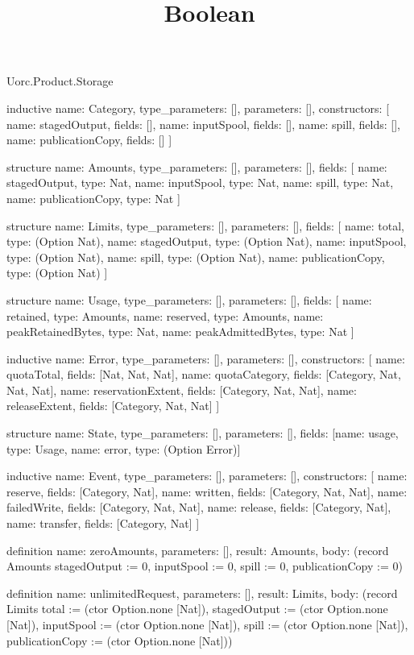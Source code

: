 \begin{lexlean}{Uorc.Product.Storage}
\title{Boolean}
\begin{semanticmodule}
inductive{
  name: Category,
  type_parameters: [],
  parameters: [],
  constructors: [
    {name: stagedOutput, fields: []},
    {name: inputSpool, fields: []},
    {name: spill, fields: []},
    {name: publicationCopy, fields: []}
  ]
}

structure{
  name: Amounts,
  type_parameters: [],
  parameters: [],
  fields: [
    {name: stagedOutput, type: Nat},
    {name: inputSpool, type: Nat},
    {name: spill, type: Nat},
    {name: publicationCopy, type: Nat}
  ]
}

structure{
  name: Limits,
  type_parameters: [],
  parameters: [],
  fields: [
    {name: total, type: (Option Nat)},
    {name: stagedOutput, type: (Option Nat)},
    {name: inputSpool, type: (Option Nat)},
    {name: spill, type: (Option Nat)},
    {name: publicationCopy, type: (Option Nat)}
  ]
}

structure{
  name: Usage,
  type_parameters: [],
  parameters: [],
  fields: [
    {name: retained, type: Amounts},
    {name: reserved, type: Amounts},
    {name: peakRetainedBytes, type: Nat},
    {name: peakAdmittedBytes, type: Nat}
  ]
}

inductive{
  name: Error,
  type_parameters: [],
  parameters: [],
  constructors: [
    {name: quotaTotal, fields: [Nat, Nat, Nat]},
    {name: quotaCategory, fields: [Category, Nat, Nat, Nat]},
    {name: reservationExtent, fields: [Category, Nat, Nat]},
    {name: releaseExtent, fields: [Category, Nat, Nat]}
  ]
}

structure{
  name: State,
  type_parameters: [],
  parameters: [],
  fields: [{name: usage, type: Usage}, {name: error, type: (Option Error)}]
}

inductive{
  name: Event,
  type_parameters: [],
  parameters: [],
  constructors: [
    {name: reserve, fields: [Category, Nat]},
    {name: written, fields: [Category, Nat, Nat]},
    {name: failedWrite, fields: [Category, Nat, Nat]},
    {name: release, fields: [Category, Nat]},
    {name: transfer, fields: [Category, Nat]}
  ]
}

definition{
  name: zeroAmounts,
  parameters: [],
  result: Amounts,
  body: (record Amounts {stagedOutput := 0, inputSpool := 0, spill := 0, publicationCopy := 0})
}

definition{
  name: unlimitedRequest,
  parameters: [],
  result: Limits,
  body: (record Limits {total := (ctor Option.none [Nat]), stagedOutput := (ctor Option.none [Nat]), inputSpool := (ctor Option.none [Nat]), spill := (ctor Option.none [Nat]), publicationCopy := (ctor Option.none [Nat])})
}


\end{semanticmodule}
\end{lexlean}

